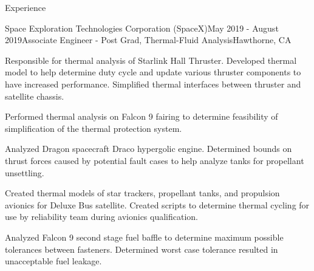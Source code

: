 \documentclass{resume} %
\begin{document}

\begin{rSection}{Experience}


\begin{rSubsection}{Space Exploration Technologies Corporation (SpaceX)}{May 2019 - August 2019}{Associate Engineer - Post Grad, Thermal-Fluid Analysis}{Hawthorne, CA}
	\item {\small Responsible for thermal analysis of Starlink Hall Thruster. Developed thermal model to help determine duty cycle and update various thruster components to have increased performance. Simplified thermal interfaces between thruster and satellite chassis.}
	\item {\small Performed thermal analysis on Falcon 9 fairing to determine feasibility of simplification of the thermal protection system.}
	\item {\small Analyzed Dragon spacecraft Draco hypergolic engine. Determined bounds on thrust forces caused by potential fault cases to help analyze tanks for propellant unsettling.  }
	\item {\small Created thermal models of star trackers, propellant tanks, and propulsion avionics for Deluxe Bus satellite. Created scripts to determine thermal cycling for use by reliability team during avionics qualification.}
	\item {\small Analyzed Falcon 9 second stage fuel baffle to determine maximum possible tolerances between fasteners. Determined worst case tolerance resulted in unacceptable fuel leakage. }
\end{rSubsection}



\end{rSection}
\end{document}
